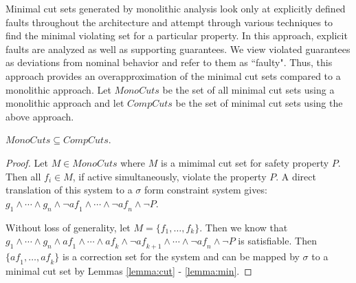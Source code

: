Minimal cut sets generated by monolithic analysis look only at explicitly defined faults throughout the architecture and attempt through various techniques to find the minimal violating set for a particular property. In this approach, explicit faults are analyzed as well as supporting guarantees. We view violated guarantees as deviations from nominal behavior and refer to them as ``faulty". Thus, this approach provides an overapproximation of the minimal cut sets compared to a monolithic approach. Let $\mathit{MonoCuts}$ be the set of all minimal cut sets using a monolithic approach and let $\mathit{CompCuts}$ be the set of minimal cut sets using the above approach. 

\begin{theorem} $\mathit{MonoCuts} \subseteq \mathit{CompCuts}$.
\begin{proof}
Let $M \in \mathit{MonoCuts}$ where $M$ is a mimimal cut set for safety property $P$. Then all $f_i \in M$, if active simultaneously, violate the property $P$. A direct translation of this system to a $\sigma$ form constraint system gives: $g_1  \land \cdots \land g_n  \land \neg \mathit{af}_{1} \land \cdots \land \neg \mathit{af}_{n} \land \neg P$. 

Without loss of generality, let $M = \{f_1, \dots, f_k\}$. Then we know that $g_1  \land \cdots \land g_n  \land \mathit{af}_1 \land \cdots \land \mathit{af}_k \land \neg \mathit{af}_{k+1} \land \cdots \land \neg \mathit{af}_{n} \land \neg P$ is satisfiable. Then $\{\mathit{af}_1, \dots,\mathit{af}_k\}$ is a correction set for the system and can be mapped by $\sigma$ to a minimal cut set by Lemmas \ref{lemma:cut} - \ref{lemma:min}.
\end{proof}
\end{theorem}





